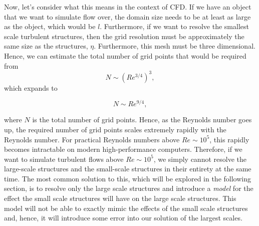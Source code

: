 Now, let's consider what this means in the context of CFD. If we have an object that we want to simulate flow over, the domain size needs to be at least as large as the object, which would be $l$. Furthermore, if we want to resolve the smallest scale turbulent structures, then the grid resolution must be approximately the same size as the structures, $\eta$. Furthermore, this mesh must be three dimensional. Hence, we can estimate the total number of grid points that would be required from
\begin{equation}
	N \sim \left(Re^{3/4}\right)^3,
\end{equation}
which expands to
\begin{eqBox}
\begin{equation}
	N \sim Re^{9/4},
\end{equation}
\end{eqBox}
where $N$ is the total number of grid points. Hence, as the Reynolds number goes up, the required number of grid points scales extremely rapidly with the Reynolds number. For practical Reynolds numbers above $Re \sim 10^5$, this rapidly becomes intractable on modern high-performance computers. Therefore, if we want to simulate turbulent flows above $Re \sim 10^5$, we simply cannot resolve the large-scale structures and the small-scale structures in their entirety at the same time. The most common solution to this, which will be explored in the following section, is to resolve only the large scale structures and introduce a {\it model} for the effect the small scale structures will have on the large scale structures. This model will not be able to exactly mimic the effects of the small scale structures and, hence, it will introduce some error into our solution of the largest scales.

